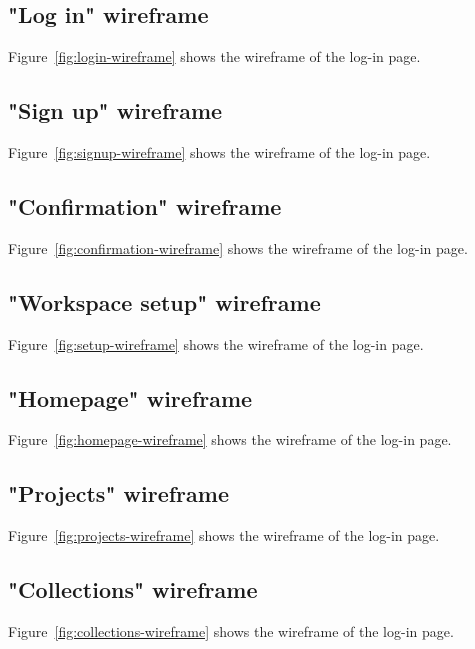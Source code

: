 \begin{toexclude}

  \subsection{"Log in" wireframe}
  Figure~\ref{fig:login-wireframe} shows the wireframe of the log-in page.


  \subsection{"Sign up" wireframe}
  Figure~\ref{fig:signup-wireframe} shows the wireframe of the log-in page.


  \subsection{"Confirmation" wireframe}
  Figure~\ref{fig:confirmation-wireframe} shows the wireframe of the log-in page.


  \subsection{"Workspace setup" wireframe}
  Figure~\ref{fig:setup-wireframe} shows the wireframe of the log-in page.


  \subsection{"Homepage" wireframe}
  Figure~\ref{fig:homepage-wireframe} shows the wireframe of the log-in page.


  \subsection{"Projects" wireframe}
  Figure~\ref{fig:projects-wireframe} shows the wireframe of the log-in page.


  \subsection{"Collections" wireframe}
  Figure~\ref{fig:collections-wireframe} shows the wireframe of the log-in page.


\end{toexclude}
